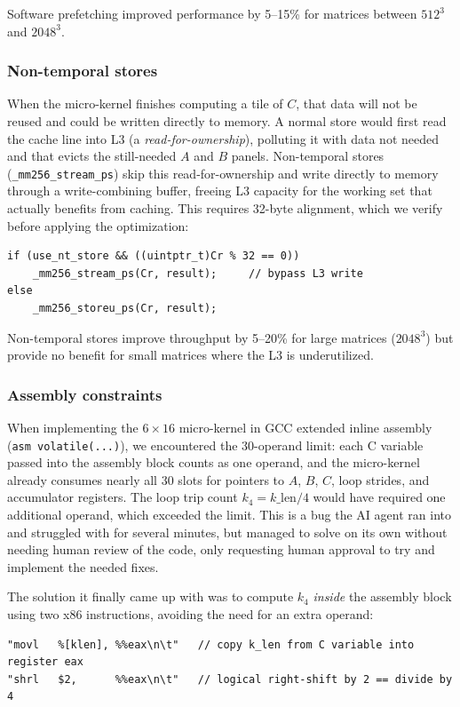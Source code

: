 \documentclass[11pt,a4paper]{article}
\begin{document}
Software prefetching improved performance by 5--15\% for matrices between $512^3$ and $2048^3$.

\subsubsection{Non-temporal stores}
When the micro-kernel finishes computing a tile of $C$, that data will not be reused and could be written directly to memory. A normal store would first read the cache line into L3 (a \emph{read-for-ownership}), polluting it with data not needed and that evicts the still-needed $A$ and $B$ panels. Non-temporal stores (\texttt{\_mm256\_stream\_ps}) skip this read-for-ownership and write directly to memory through a write-combining buffer, freeing L3 capacity for the working set that actually benefits from caching. This requires 32-byte alignment, which we verify before applying the optimization:
\begin{lstlisting}
if (use_nt_store && ((uintptr_t)Cr % 32 == 0))
    _mm256_stream_ps(Cr, result);     // bypass L3 write
else
    _mm256_storeu_ps(Cr, result);
\end{lstlisting}
Non-temporal stores improve throughput by 5--20\% for large matrices ($2048^3$) but provide no benefit for small matrices where the L3 is underutilized.

\subsubsection{Assembly constraints}
When implementing the $6\times16$ micro-kernel in GCC extended inline assembly
(\texttt{asm volatile(...)}), we encountered the 30-operand limit: each C variable
passed into the assembly block counts as one operand, and the micro-kernel already
consumes nearly all 30 slots for pointers to $A$, $B$, $C$, loop strides, and
accumulator registers.
The loop trip count $k_4 = k\_\text{len}/4$ would have required one additional
operand, which exceeded the limit. This is a bug the AI agent ran into and struggled with for several minutes, but managed to solve on its own without needing human review of the code, only requesting human approval to try and implement the needed fixes.

The solution it finally came up with was to compute $k_4$ \emph{inside} the assembly block using two x86
instructions, avoiding the need for an extra operand:
\begin{lstlisting}[language={[x86masm]Assembler}]
"movl   %[klen], %%eax\n\t"   // copy k_len from C variable into register eax
"shrl   $2,      %%eax\n\t"   // logical right-shift by 2 == divide by 4
\end{lstlisting}
\end{document}

